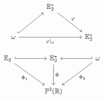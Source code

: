 \documentclass{article}
\begin{document}
\begingroup
{}
\[
\begin{tikzcd}[row sep=large, column sep=large]
& \mathbb{E}_2^* \arrow[dr, "\varphi"] & \\
\omega \arrow[ur, hook] \arrow[rr, "\varphi|_{\omega}"'] & & \mathbb{E}_2^*
\end{tikzcd}
\]
\endgroup

\begingroup
{}
\[
\begin{tikzcd}[row sep=3em, column sep=4em]
\mathbb{E}_2 \arrow[r, hook] \arrow[dr, "\Phi_1"'] 
& \mathbb{E}_2^\star \arrow[d, "\Phi"] 
& \omega \arrow[l, hook'] \arrow[dl, "\Phi_2"] \\
& \mathbb{P}^2(\mathbb{R}) &
\end{tikzcd}
\]
\endgroup
\end{document}
